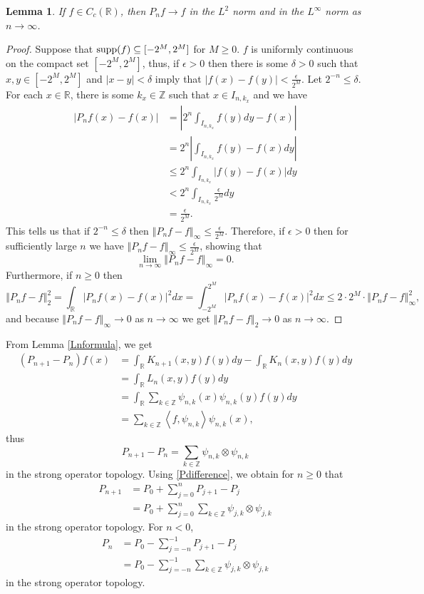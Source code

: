 \documentclass{article}
\newcommand{\inner}[2]{\left\langle #1, #2 \right\rangle}
\newcommand{\supp}{\ensuremath\mathrm{supp}}
\newcommand{\norm}[1]{\left\Vert #1 \right\Vert}
\newtheorem{lemma}[theorem]{Lemma}
\theoremstyle{definition}
\begin{document}
\begin{lemma}
If $f \in C_c(\mathbb{R})$, then $P_nf \to f$ in the $L^2$ norm and in the $L^\infty$ norm as $n \to \infty$.
\label{positivelimit}
\end{lemma}
\begin{proof}
Suppose that $\supp(f) \subseteq [-2^M,2^M]$ for $M \geq 0$. $f$ is uniformly continuous on the compact set $[-2^M,2^M]$, thus, if $\epsilon>0$ then there is some
$\delta>0$ such that $x, y \in [-2^M,2^M]$ and $|x-y|<\delta$ imply that $|f(x)-f(y)|<\frac{\epsilon}{2^M}$.
Let $2^{-n} \leq \delta$. For each $x \in \mathbb{R}$,  there is some $k_x \in \mathbb{Z}$ such that $x \in I_{n,k_x}$ and we have
\begin{align*}
|P_n f(x)-f(x)| &= \left|  2^n \int_{I_{n,k_x}} f(y) dy - f(x) \right|\\
&=2^n \left| \int_{I_{n,k_x}} f(y)-f(x) dy \right|\\
&\leq 2^n \int_{I_{n,k_x}} |f(y)-f(x)| dy\\
&<2^n \int_{I_{n,k_x}} \frac{\epsilon}{2^M} dy\\
&=\frac{\epsilon}{2^M}.
\end{align*}
This tells us that if $2^{-n} \leq \delta$ then $\norm{P_nf -f}_\infty \leq \frac{\epsilon}{2^M}$. Therefore, if $\epsilon>0$ then for sufficiently large
$n$ we have $\norm{P_nf-f}_\infty \leq \frac{\epsilon}{2^M}$, showing that
\[
\lim_{n \to \infty} \norm{P_nf-f}_\infty=0.
\]
Furthermore, if $n \geq 0$ then
\[
\norm{P_nf-f}_2^2=\int_{\mathbb{R}} |P_nf(x)-f(x)|^2 dx
=\int_{-2^M}^{2^M} |P_nf(x)-f(x)|^2 dx
\leq 2\cdot 2^M \cdot \norm{P_nf-f}_\infty^2,
 \]
 and because $\norm{P_nf-f}_\infty \to 0$ as $n \to \infty$ we get $\norm{P_nf-f}_2 \to 0$ as $n \to \infty$.
\end{proof}

From Lemma \ref{Lnformula}, we get
\begin{align*}
(P_{n+1}-P_n)f(x)&=\int_{\mathbb{R}} K_{n+1}(x,y)f(y)dy-\int_{\mathbb{R}} K_n(x,y)f(y)dy\\
&=\int_{\mathbb{R}} L_n(x,y)f(y) dy\\
&=\int_{\mathbb{R}} \sum_{k \in \mathbb{Z}} \psi_{n,k}(x)\psi_{n,k}(y) f(y) dy\\
&=\sum_{k \in \mathbb{Z}} \inner{f}{\psi_{n,k}} \psi_{n,k}(x),
\end{align*}
thus
\begin{equation}
P_{n+1}-P_n=\sum_{k \in \mathbb{Z}} \psi_{n,k} \otimes \psi_{n,k}
\label{Pdifference}
\end{equation}
in the strong operator topology. Using \eqref{Pdifference}, we obtain for $n \geq 0$ that
\begin{align*}
P_{n+1}&=P_0 + \sum_{j=0}^n P_{j+1}-P_j\\
&=P_0+\sum_{j=0}^n \sum_{k \in \mathbb{Z}} \psi_{j,k} \otimes \psi_{j,k}
\end{align*}
in the strong operator topology. For $n<0$,
\begin{align*}
P_n&=P_0-\sum_{j=-n}^{-1} P_{j+1}-P_j\\
&=P_0 - \sum_{j=-n}^{-1} \sum_{k \in \mathbb{Z}} \psi_{j,k} \otimes \psi_{j,k}
\end{align*}
in the strong operator topology.
\end{document}
